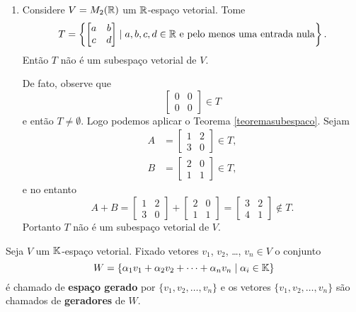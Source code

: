 \begin{exemplos}
\begin{enumerate}[label={\arabic*})]
		\item Considere $V = M_2(\mathbb{R})$ um $\mathbb{R}$-espaço vetorial. Tome
			\[
				T = \left\{
					\begin{bmatrix}
						a & b\\
						c & d
					\end{bmatrix}
					\mid a, b, c, d \in \mathbb{R} \mbox{ e pelo menos uma entrada nula}
				\right\}.
			\]
			Então $T$ não é um subespaço vetorial de $V$.
			\begin{solucao}
				De fato, observe que
				\[
					\begin{bmatrix}
						0 & 0\\
						0 & 0
					\end{bmatrix} \in T
				\]
				e então $T \ne \emptyset$. Logo podemos aplicar o Teorema \ref{teoremasubespaco}. Sejam
				\begin{align*}
					A &= \begin{bmatrix}1 & 2\\3 & 0\end{bmatrix} \in T,\\
					B &= \begin{bmatrix}2 & 0\\1 & 1\end{bmatrix} \in T,
				\end{align*}
				e no entanto
				\[
					A + B = \begin{bmatrix}1 & 2\\3 & 0\end{bmatrix} +
					\begin{bmatrix}2 & 0\\1 & 1\end{bmatrix} =
					\begin{bmatrix}3 & 2\\4 & 1 \end{bmatrix}\notin T.
				\]
				Portanto $T$ não é um subespaço vetorial de $V$.
			\end{solucao}
	\end{enumerate}
\end{exemplos}


\begin{definicao}
	Seja $V$ um $\mathbb{K}$-espaço vetorial. Fixado vetores $v_1$, $v_2$, \dots, $v_n \in V$ o conjunto
	\[
	W = \{\alpha_1v_1 + \alpha_2v_2 + \cdots + \alpha_nv_n \mid \alpha_i \in \mathbb{K}\}
	\]
	é chamado de \textbf{espaço gerado} por $\{v_1, v_2, \dots, v_n\}$ e os vetores $\{v_1, v_2, \dots, v_n\}$ são chamados de \textbf{geradores} de $W$.
\end{definicao}

